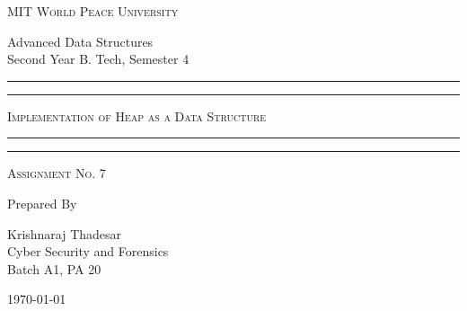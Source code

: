 \documentclass[11pt]{article}
\begin{document}
\begin{titlepage}
    \centering


    \huge\textsc{
        MIT World Peace University
    }\\

    \vspace{0.75\baselineskip} %

    \LARGE{
        Advanced Data Structures\\
        Second Year B. Tech, Semester 4
    }

    \vfill %


    \rule{\textwidth}{1.6pt}\vspace*{-\baselineskip}\vspace*{2pt}
    \rule{\textwidth}{0.6pt}
    \vspace{0.75\baselineskip} %



    \huge{\textsc{
            Implementation of Heap as a Data Structure
        }} \\



    \vspace{0.5\baselineskip} %
    \rule{\textwidth}{0.6pt}\vspace*{-\baselineskip}\vspace*{2.8pt}
    \rule{\textwidth}{1.6pt}

    \vspace{1\baselineskip} %


    \LARGE\textsc{
        Assignment No. 7
    } %
    \vfill


    Prepared By
    \vspace{0.5\baselineskip} %

    \Large{
        Krishnaraj Thadesar \\
        Cyber Security and Forensics\\
        Batch A1, PA 20
    }


    \vspace{0.5\baselineskip} %
    \today

\end{titlepage}
\end{document}
